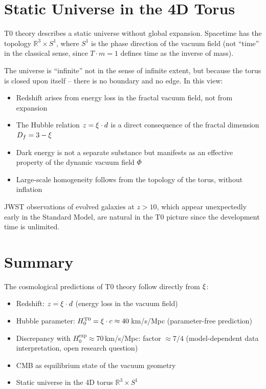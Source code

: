\section{Static Universe in the 4D Torus}

T0 theory describes a static universe without global expansion. Spacetime 
has the topology $\mathbb{R}^3 \times S^1$, where $S^1$ is the phase 
direction of the vacuum field (not ``time'' in the classical sense, since 
$T \cdot m = 1$ defines time as the inverse of mass).

The universe is ``infinite'' not in the sense of infinite extent, but because 
the torus is closed upon itself -- there is no boundary and no edge. In this 
view:

\begin{itemize}
\item Redshift arises from energy loss in the fractal vacuum field, not from 
expansion
\item The Hubble relation $z = \xi \cdot d$ is a direct consequence of the 
fractal dimension $D_f = 3 - \xi$
\item Dark energy is not a separate substance but manifests as an effective 
property of the dynamic vacuum field $\Phi$
\item Large-scale homogeneity follows from the topology of the torus, without 
inflation
\end{itemize}

JWST observations of evolved galaxies at $z > 10$, which appear unexpectedly 
early in the Standard Model, are natural in the T0 picture since the 
development time is unlimited.

\section{Summary}

The cosmological predictions of T0 theory follow directly from $\xi$:

\begin{itemize}
\item Redshift: $z = \xi \cdot d$ (energy loss in the vacuum field)
\item Hubble parameter: $H_0^{\text{T0}} = \xi \cdot c \approx 40\,$km/s/Mpc 
(parameter-free prediction)
\item Discrepancy with $H_0^{\text{exp}} \approx 70\,$km/s/Mpc: factor $\approx 7/4$ 
(model-dependent data interpretation, open research question)
\item CMB as equilibrium state of the vacuum geometry
\item Static universe in the 4D torus $\mathbb{R}^3 \times S^1$
\end{itemize}

